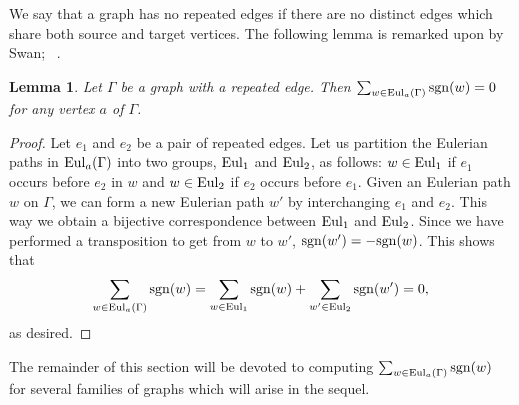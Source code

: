 \documentclass{amsproc}
\newtheorem{lemma}[theorem]{Lemma}
\theoremstyle{definition}
\theoremstyle{remark}
\numberwithin{equation}{section}
\newcommand{\sgn}{{\rm sgn}}
\newcommand{\uni}{{\rm Eul}}
\begin{document}
We say that a graph has no repeated edges if there are no distinct edges which share both source and target vertices. 
The following lemma is remarked upon by Swan; ~\cite[page~369]{swan}.

\begin{lemma}\label{repeated_edges}
Let $\Gamma$ be a graph with a repeated edge. Then $\sum_{w\in \uni_{a}(\Gamma)}\sgn(w)=0$ for any vertex $a$ of $\Gamma$.
\end{lemma}

\begin{proof}
Let $e_1$ and $e_2$ be a pair of repeated edges. Let us partition the Eulerian paths in $\uni_{a}(\Gamma)$ into two groups, $\uni_1$ and $\uni_2$, as follows:
$w \in \uni_1$ if $e_1$ occurs before $e_2$ in $w$ and $w \in \uni_2$ if $e_2$ occurs before $e_1$. 
Given an Eulerian path $w$ on $\Gamma$, we can form a new Eulerian path $w'$ by interchanging $e_1$ and $e_2$. This way we obtain a bijective correspondence 
between $\uni_1$ and $\uni_2$. Since we have performed a transposition to get from $w$ to $w'$, $\sgn(w')=-\sgn(w)$. 
This shows that  %
\[ \sum_{w\in \uni_{a}(\Gamma)}\sgn(w)= \sum_{w\in \uni_1}\sgn(w) +  \sum_{w' \in \uni_2} \sgn(w') = 0 , \] as desired.
\end{proof}

The remainder of this section will be devoted to computing $\sum_{w\in \uni_{a}(\Gamma)}\sgn(w)$ for several families of graphs which will arise in the sequel.
\end{document}
